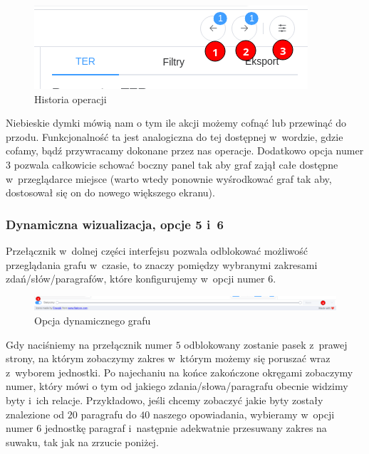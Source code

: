 \documentclass[12pt, a4paper]{article}
\begin{document}
\begin{figure}[H]
  \centering
  \includegraphics[width=\linewidth]{images/graph-top-navigation.png}
  \caption{Historia operacji}
\end{figure}

\noindent Niebieskie dymki mówią nam o tym ile akcji możemy cofnąć lub przewinąć do przodu. Funkcjonalność ta jest analogiczna do tej dostępnej w~wordzie, gdzie cofamy, bądź przywracamy dokonane przez nas operacje. Dodatkowo opcja numer $3$ pozwala całkowicie schować boczny panel tak aby graf zajął całe dostępne w~przeglądarce miejsce (warto wtedy ponownie wyśrodkować graf tak aby, dostosował się on do nowego większego ekranu).

\subsubsection{Dynamiczna wizualizacja, opcje 5 i~6}

Przełącznik w~dolnej części interfejsu pozwala odblokować możliwość przeglądania grafu w~czasie, to znaczy pomiędzy wybranymi zakresami zdań/słów/paragrafów, które konfigurujemy w~opcji numer $6$.

\begin{figure}[H]
  \centering
  \includegraphics[width=\linewidth]{images/graph-down-menu.png}
  \caption{Opcja dynamicznego grafu}
\end{figure}

Gdy naciśniemy na przełącznik numer $5$ odblokowany zostanie pasek z~prawej strony, na którym zobaczymy zakres w~którym możemy się poruszać wraz z~wyborem jednostki. Po najechaniu na końce zakończone okręgami zobaczymy numer, który mówi o tym od jakiego zdania/słowa/paragrafu obecnie widzimy byty i~ich relacje. Przykładowo, jeśli chcemy zobaczyć jakie byty zostały znalezione od $20$ paragrafu do $40$ naszego opowiadania, wybieramy w~opcji numer $6$ jednostkę paragraf i~następnie adekwatnie przesuwany zakres na suwaku, tak jak na zrzucie poniżej.
\end{document}
